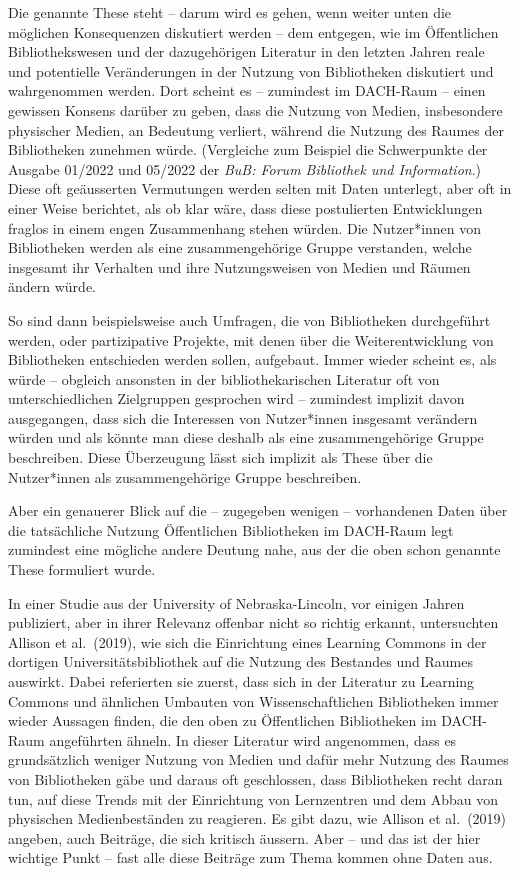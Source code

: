 \documentclass[a4paper,
fontsize=11pt,
oneside,
numbers=noperiodatend,
parskip=half-,
bibliography=totoc,
final
]{scrartcl}
\begin{document}
Die genannte These steht -- darum wird es gehen, wenn weiter unten die
möglichen Konsequenzen diskutiert werden -- dem entgegen, wie im
Öffentlichen Bibliothekswesen und der dazugehörigen Literatur in den
letzten Jahren reale und potentielle Veränderungen in der Nutzung von
Bibliotheken diskutiert und wahrgenommen werden. Dort scheint es --
zumindest im DACH-Raum -- einen gewissen Konsens darüber zu geben, dass
die Nutzung von Medien, insbesondere physischer Medien, an Bedeutung
verliert, während die Nutzung des Raumes der Bibliotheken zunehmen
würde. (Vergleiche zum Beispiel die Schwerpunkte der Ausgabe 01/2022 und
05/2022 der \emph{BuB: Forum Bibliothek und Information}.) Diese oft
geäusserten Vermutungen werden selten mit Daten unterlegt, aber oft in
einer Weise berichtet, als ob klar wäre, dass diese postulierten
Entwicklungen fraglos in einem engen Zusammenhang stehen würden. Die
Nutzer*innen von Bibliotheken werden als eine zusammengehörige Gruppe
verstanden, welche insgesamt ihr Verhalten und ihre Nutzungsweisen von
Medien und Räumen ändern würde.

So sind dann beispielsweise auch Umfragen, die von Bibliotheken
durchgeführt werden, oder partizipative Projekte, mit denen über die
Weiterentwicklung von Bibliotheken entschieden werden sollen, aufgebaut.
Immer wieder scheint es, als würde -- obgleich ansonsten in der
bibliothekarischen Literatur oft von unterschiedlichen Zielgruppen
gesprochen wird -- zumindest implizit davon ausgegangen, dass sich die
Interessen von Nutzer*innen insgesamt verändern würden und als könnte
man diese deshalb als eine zusammengehörige Gruppe beschreiben. Diese
Überzeugung lässt sich implizit als These über die Nutzer*innen als
zusammengehörige Gruppe beschreiben.

Aber ein genauerer Blick auf die -- zugegeben wenigen -- vorhandenen
Daten über die tatsächliche Nutzung Öffentlichen Bibliotheken im
DACH-Raum legt zumindest eine mögliche andere Deutung nahe, aus der die
oben schon genannte These formuliert wurde.

In einer Studie aus der University of Nebraska-Lincoln, vor einigen
Jahren publiziert, aber in ihrer Relevanz offenbar nicht so richtig
erkannt, untersuchten Allison et al.~(2019), wie sich die Einrichtung
eines Learning Commons in der dortigen Universitätsbibliothek auf die
Nutzung des Bestandes und Raumes auswirkt. Dabei referierten sie zuerst,
dass sich in der Literatur zu Learning Commons und ähnlichen Umbauten
von Wissenschaftlichen Bibliotheken immer wieder Aussagen finden, die
den oben zu Öffentlichen Bibliotheken im DACH-Raum angeführten ähneln.
In dieser Literatur wird angenommen, dass es grundsätzlich weniger
Nutzung von Medien und dafür mehr Nutzung des Raumes von Bibliotheken
gäbe und daraus oft geschlossen, dass Bibliotheken recht daran tun, auf
diese Trends mit der Einrichtung von Lernzentren und dem Abbau von
physischen Medienbeständen zu reagieren. Es gibt dazu, wie Allison et
al.~(2019) angeben, auch Beiträge, die sich kritisch äussern. Aber --
und das ist der hier wichtige Punkt -- fast alle diese Beiträge zum
Thema kommen ohne Daten aus.
\end{document}
